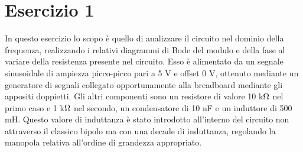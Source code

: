 \section{Esercizio 1}

In questo esercizio lo scopo è quello di analizzare il circuito nel dominio della frequenza, realizzando i relativi
diagrammi di Bode del modulo e della fase al variare della resistenza presente nel circuito. Esso è alimentato
da un segnale sinusoidale di ampiezza picco-picco pari a 5 V e offset 0 V, ottenuto mediante un generatore di
segnali collegato opportunamente alla breadboard mediante gli appositi doppietti. Gli altri componenti sono
un resistore di valore 10 k$\ohm$ nel primo caso e 1 k$\ohm$ nel secondo, un condensatore di 10 nF e un induttore di
500 mH. Questo valore di induttanza è stato introdotto all’interno del circuito non attraverso il classico bipolo
ma con una decade di induttanza, regolando la manopola relativa all’ordine di grandezza appropriato.

